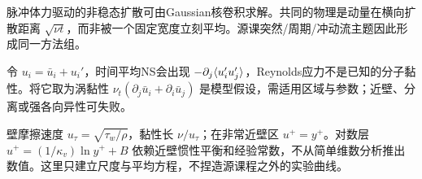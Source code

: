 脉冲体力驱动的非稳态扩散可由Gaussian核卷积求解。共同的物理是动量在横向扩散距离 $\sqrt{\nu t}$，而非被一个固定宽度立刻平均。源课突然/周期/冲动流主题因此形成同一方法组。

令 $u_i=\bar u_i+u_i'$，时间平均NS会出现 $-\partial_j\langle u_i'u_j'\rangle$，Reynolds应力不是已知的分子黏性。将它取为涡黏性 $\nu_t(\partial_j\bar u_i+\partial_i\bar u_j)$ 是模型假设，需适用区域与参数；近壁、分离或强各向异性可失败。

壁摩擦速度 $u_\tau=\sqrt{\tau_w/\rho}$，黏性长 $\nu/u_\tau$；在非常近壁区 $u^+=y^+$。对数层 $u^+=(1/\kappa_v)\ln y^++B$ 依赖近壁惯性平衡和经验常数，不从简单维数分析推出数值。这里只建立尺度与平均方程，不捏造源课程之外的实验曲线。

